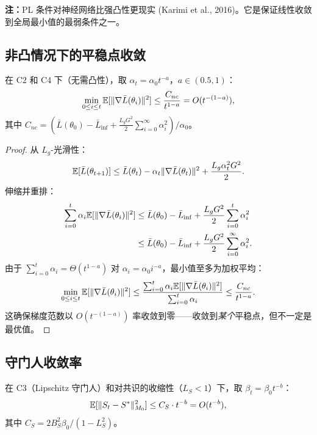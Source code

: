 \textbf{注：}PL 条件对神经网络比强凸性更现实 (Karimi et al., 2016)。它是保证线性收敛到全局最小值的最弱条件之一。

\subsection{非凸情况下的平稳点收敛}

\begin{theorem}[非凸平稳性率]\label{thm:rate-nonconvex}
在 C2 和 C4 下（无需凸性），取 $\alpha_t = \alpha_0 t^{-a}$，$a \in (0.5, 1)$：
\begin{equation}
    \min_{0 \leq i \leq t} \mathbb{E}[\|\nabla \bar{L}(\theta_i)\|^2] \leq \frac{C_{nc}}{t^{1-a}} = O(t^{-(1-a)}),
\end{equation}
其中 $C_{nc} = (\bar{L}(\theta_0) - \bar{L}_{\inf} + \frac{L_g G^2}{2} \sum_{i=0}^\infty \alpha_i^2) / \alpha_0$。
\end{theorem}

\begin{proof}
从 $L_g$-光滑性：
\begin{equation}
    \mathbb{E}[\bar{L}(\theta_{t+1})] \leq \bar{L}(\theta_t) - \alpha_t \|\nabla \bar{L}(\theta_t)\|^2 + \frac{L_g \alpha_t^2 G^2}{2}.
\end{equation}
伸缩并重排：
\begin{align}
    \sum_{i=0}^t \alpha_i \mathbb{E}[\|\nabla \bar{L}(\theta_i)\|^2] &\leq \bar{L}(\theta_0) - \bar{L}_{\inf} + \frac{L_g G^2}{2} \sum_{i=0}^t \alpha_i^2 \\
    &\leq \bar{L}(\theta_0) - \bar{L}_{\inf} + \frac{L_g G^2}{2} \sum_{i=0}^\infty \alpha_i^2.
\end{align}
由于 $\sum_{i=0}^t \alpha_i = \Theta(t^{1-a})$ 对 $\alpha_i = \alpha_0 i^{-a}$，最小值至多为加权平均：
\begin{equation}
    \min_{0 \leq i \leq t} \mathbb{E}[\|\nabla \bar{L}(\theta_i)\|^2] \leq \frac{\sum_{i=0}^t \alpha_i \mathbb{E}[\|\nabla \bar{L}(\theta_i)\|^2]}{\sum_{i=0}^t \alpha_i} \leq \frac{C_{nc}}{t^{1-a}}.
\end{equation}
这确保梯度范数以 $O(t^{-(1-a)})$ 率收敛到零——收敛到\textit{某个}平稳点，但不一定是最优值。
\end{proof}

\subsection{守门人收敛率}

\begin{theorem}[守门人收敛率]\label{thm:rate-gatekeeper}
在 C3（Lipschitz 守门人）和对共识的收缩性（$L_S < 1$）下，取 $\beta_t = \beta_0 t^{-b}$：
\begin{equation}
    \mathbb{E}[\|S_t - S^*\|_{M_0}^2] \leq C_S \cdot t^{-b} = O(t^{-b}),
\end{equation}
其中 $C_S = 2 B_S^2 \beta_0 / (1 - L_S^2)$。
\end{theorem}

